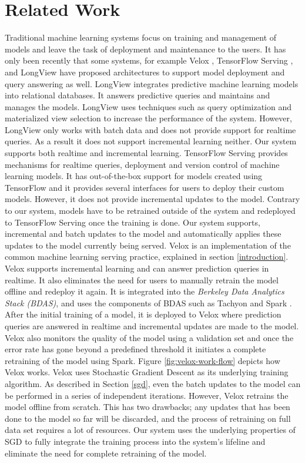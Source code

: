 \documentclass{vldb}
\begin{document}
\section{Related Work} \label{related-work}
Traditional machine learning systems focus on training and management of models and leave the task of deployment and maintenance to the users. 
It has only been recently that some systems, for example Velox \cite{crankshaw2014missing}, TensorFlow Serving \cite{abadi2016tensorflow}, and LongView \cite{akdere2011case} have proposed architectures to support model deployment and query answering as well. 
LongView integrates predictive machine learning models into relational databases. 
It answers predictive queries and maintains and manages the models.
LongView uses techniques such as query optimization and materialized view selection to increase the performance of the system.
However, LongView only works with batch data and does not provide support for realtime queries. 
As a result it does not support incremental learning neither.
Our system supports both realtime and incremental learning.
TensorFlow Serving provides mechanisms for realtime queries, deployment and version control of machine learning models.
It has out-of-the-box support for models created using TensorFlow and it provides several interfaces for users to deploy their custom models.
However, it does not provide incremental updates to the model.
Contrary to our system, models have to be retrained outside of the system and redeployed to TensorFlow Serving once the training is done.
Our system supports, incremental and batch updates to the model and automatically applies these updates to the model currently being served.
Velox \cite{crankshaw2014missing} is an implementation of the common machine learning serving practice, explained in section \ref{introduction}.
Velox supports incremental learning and can answer prediction queries in realtime.
It also eliminates the need for users to manually retrain the model offline and redeploy it again.
It is integrated into the \textit{Berkeley Data Analytics Stack (BDAS)}, and uses the components of BDAS such as Tachyon \cite{li2014tachyon} and Spark \cite{zaharia2010spark}. 
After the initial training of a model, it is deployed to Velox where prediction queries are answered in realtime and incremental updates are made to the model.
Velox also monitors the quality of the model using a validation set and once the error rate has gone beyond a predefined threshold it initiates a complete retraining of the model using Spark. 
Figure \ref{fig:velox-work-flow} depicts how Velox works. 
Velox uses Stochastic Gradient Descent as its underlying training algorithm.
As described in Section \ref{sgd}, even the batch updates to the model can be performed in a series of independent iterations.
However, Velox retrains the model offline from scratch.
This has two drawbacks; any updates that has been done to the model so far will be discarded, and the process of retraining on full data set requires a lot of resources.
Our system uses the underlying properties of SGD to fully integrate the training process into the system's lifeline and eliminate the need for complete retraining of the model.
\end{document}
